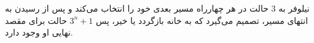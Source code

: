 \p
	نیلوفر به 3 حالت در هر چهارراه مسیر بعدی خود را انتخاب می‌کند و پس از رسیدن به انتهای مسیر، تصمیم می‌گیرد که به خانه بازگردد یا خیر، پس 
	$3^n + 1$
	حالت برای مقصد نهایی او وجود دارد.
	
